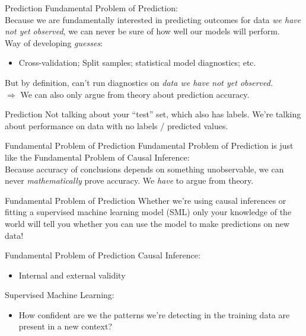 \documentclass[11pt]{beamer}
\begin{document}
\begin{frame}[c]{Prediction}
  \alert{Fundamental Problem of Prediction:} \\
  Because we are fundamentally interested in predicting outcomes for data \emph{we have not yet observed}, we can \alert{never} be sure of how well our models will perform. \\
  \pause Way of developing \emph{guesses}:
  \begin{itemize}
    \item Cross-validation; Split samples; statistical model diagnostics; etc.
  \end{itemize}
  \pause But by definition, can't run diagnostics on \emph{data we have not yet observed.} \\
  $\Rightarrow$ We can also only argue \alert{from theory} about prediction accuracy.
\end{frame}

\begin{frame}[c]{Prediction}
 \alert{Not} talking about your ``test'' set, which also has labels. We're talking about performance on data with no labels / predicted values.
\end{frame}

\begin{frame}[c]{Fundamental Problem of Prediction}
    \alert{Fundamental Problem of Prediction} is just like the \alert{Fundamental Problem of Causal Inference}: \\
    Because accuracy of conclusions depends on something unobservable, we can never \emph{mathematically} prove accuracy. We \emph{have} to argue from theory.
\end{frame}

\begin{frame}[c]{Fundamental Problem of Prediction}
Whether we're using causal inferences or fitting a supervised machine learning model (SML) only your knowledge of the world will tell you whether you can use the model to make predictions on new data!

\end{frame}

\begin{frame}[c]{Fundamental Problem of Prediction}
Causal Inference:
\begin{itemize}
  \item Internal and external validity
\end{itemize}
Supervised Machine Learning:
\begin{itemize}
  \item How confident are we the patterns we're detecting in the training data are present in a new context?
\end{itemize}
\end{frame}
\end{document}

